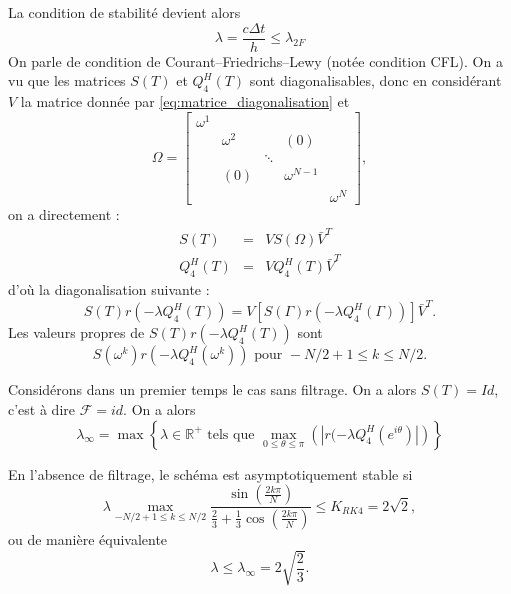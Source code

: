 La condition de stabilité devient alors
\begin{equation}
\lambda = \dfrac{c \Delta t}{h} \leq \lambda_{2F}
\end{equation}
On parle de condition de Courant–Friedrichs–Lewy \cite{Courant1928} (notée condition CFL). On a vu que les matrices $S(T)$ et $Q_4^H(T)$ sont diagonalisables, donc en considérant $V$ la matrice donnée par \eqref{eq:matrice_diagonalisation} et
\begin{equation}
\Omega = \begin{bmatrix}
\omega^1 &   &   &   &   \\ 
  & \omega^2 &   & (0) &   \\ 
  &   & \ddots &   &   \\ 
  & (0) &   & \omega^{N-1} &   \\ 
  &   &   &   & \omega^N
\end{bmatrix},
\end{equation}
on a directement :
\begin{equation}
\begin{array}{rcl}
S(T) & = & V S(\Omega) \bar{V}^T \\
Q_4^H(T) & = & V Q_4^H(T) \bar{V}^T
\end{array}
\end{equation}
d'où la diagonalisation suivante :
\begin{equation}
S(T)r(-\lambda Q_4^H(T)) = V \left[ S(\Gamma)r(-\lambda Q_4^H(\Gamma)) \right] \bar{V}^T.
\end{equation}
Les valeurs propres de $S(T)r(-\lambda Q_4^H(T))$ sont
\begin{equation}
S(\omega^k)r(-\lambda Q_4^H(\omega^k))  \text{ pour } -N/2+1 \leq k \leq N/2. 
\end{equation}


Considérons dans un premier temps le cas sans filtrage. On a alors $S(T) = Id$, c'est à dire $\mathcal{F} = id$. On a alors
\begin{equation}
\lambda_{\infty} = \max \left\lbrace \lambda \in \mathbb{R}^+ \text{ tels que } \max_{0 \leq \theta \leq \pi} \left( | r(-\lambda Q_4^H(e^{i \theta}) | \right) \right\rbrace
\end{equation}

\begin{theoreme}
En l'absence de filtrage, le schéma est asymptotiquement stable si 
\begin{equation}
\lambda \max_{-N/2+1 \leq k \leq N/2} \dfrac{\sin \left( \frac{2 k \pi}{N} \right)}{\frac{2}{3} + \frac{1}{3} \cos \left( \frac{2 k \pi}{N} \right)} \leq K_{RK4} = 2 \sqrt{2},
\end{equation}
ou de manière équivalente
\begin{equation}
\lambda \leq \lambda_{\infty} = 2\sqrt{\dfrac{2}{3}}.
\end{equation}
\end{theoreme}


